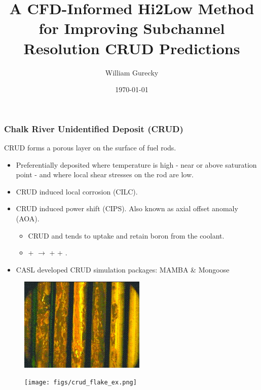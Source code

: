 \documentclass[t, pdftex]{beamer}
\title{A CFD-Informed Hi2Low Method for Improving Subchannel Resolution CRUD Predictions}
\subtitle{}
\author{William Gurecky}
\date{\today}
\begin{document}

\titleframe
{}

\begin{frame}[shrink=10]
    \frametitle{Chalk River Unidentified Deposit (CRUD)}
    CRUD forms a porous layer on the surface of fuel rods.
    \begin{itemize}
    \item Preferentially deposited where temperature is high - near or above saturation point - and where local shear stresses on the rod are low.
	\item CRUD induced local corrosion (CILC).
    \item CRUD induced power shift (CIPS). Also known as axial offset anomaly (AOA).
    \begin{itemize} 
    	\item CRUD and tends to uptake and retain boron from the coolant.
    	\item {} +    $\rightarrow$  +  +  .
    \end{itemize}
    \item CASL developed CRUD simulation packages: MAMBA \& Mongoose
    \end{itemize}
%
    \begin{figure}
        \centering
        \begin{minipage}{.7\textwidth}
            \centering
            \includegraphics[width=6cm]{figs/crud-crud.jpg}
        \end{minipage}%
        \begin{minipage}{.4\textwidth}
            \centering
            \texttt{[image: figs/crud\_flake\_ex.png]}
        \end{minipage}
    \end{figure}
\end{frame}
\end{document}
